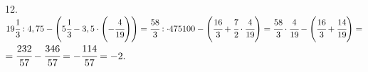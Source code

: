 12. $19\cfrac{1}{3}:4,75-\left(5\cfrac{1}{3}-3,5\cdot\left(-\cfrac{4}{19}\right)\right)=
\cfrac{58}{3}:\cdot{475}{100}-\left(\cfrac{16}{3}+\cfrac{7}{2}\cdot\cfrac{4}{19}\right)=
\cfrac{58}{3}\cdot\cfrac{4}{19}-\left(\cfrac{16}{3}+\cfrac{14}{19}\right)=$\\$=\cfrac{232}{57}-\cfrac{346}{57}=-\cfrac{114}{57}=-2.$\\

